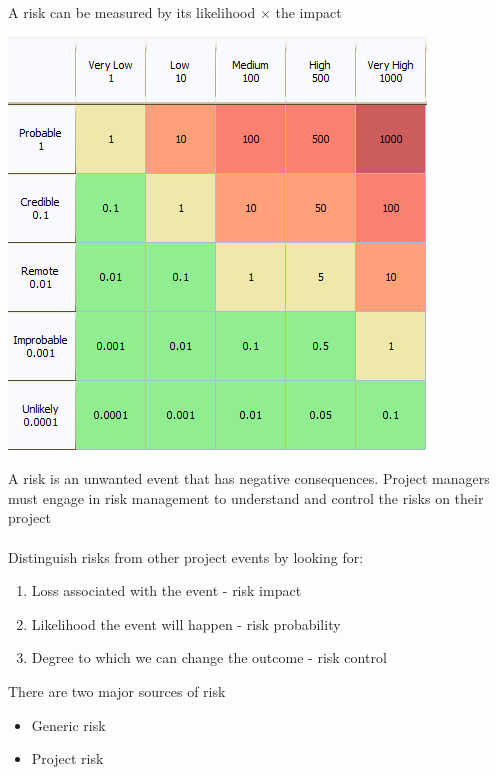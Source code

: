 \documentclass{article}[18pt]
\begin{document}
A risk can be measured by its likelihood $\times$ the impact 
\begin{center}
	\includegraphics[scale=0.5]{risk}
\end{center}
A risk is an unwanted event that has negative consequences. Project managers must engage in risk management to understand and control the risks on their project\\
\\
Distinguish risks from other project events by looking for:
\begin{enumerate}
	\item Loss associated with the event - risk impact
	\item Likelihood the event will happen - risk probability
	\item Degree to which we can change the outcome - risk control
\end{enumerate}
There are two major sources of risk
\begin{itemize}
	\item Generic risk
	\item Project risk
\end{itemize}
\end{document}
